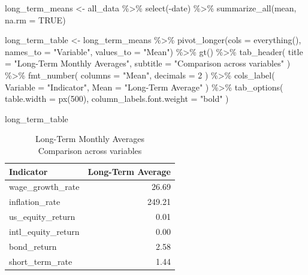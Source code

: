 \documentclass[
  letterpaper,
  DIV=11,
  numbers=noendperiod]{scrartcl}
\newenvironment{Shaded}{\begin{snugshade}}{\end{snugshade}}
\newcommand{\AttributeTok}[1]{\textcolor[rgb]{0.40,0.45,0.13}{#1}}
\newcommand{\ConstantTok}[1]{\textcolor[rgb]{0.56,0.35,0.01}{#1}}
\newcommand{\DecValTok}[1]{\textcolor[rgb]{0.68,0.00,0.00}{#1}}
\newcommand{\FunctionTok}[1]{\textcolor[rgb]{0.28,0.35,0.67}{#1}}
\newcommand{\NormalTok}[1]{\textcolor[rgb]{0.00,0.23,0.31}{#1}}
\newcommand{\OtherTok}[1]{\textcolor[rgb]{0.00,0.23,0.31}{#1}}
\newcommand{\SpecialCharTok}[1]{\textcolor[rgb]{0.37,0.37,0.37}{#1}}
\newcommand{\StringTok}[1]{\textcolor[rgb]{0.13,0.47,0.30}{#1}}
\begin{document}
\begin{Shaded}
\begin{Highlighting}[]
\NormalTok{long\_term\_means }\OtherTok{\textless{}{-}}\NormalTok{ all\_data }\SpecialCharTok{\%\textgreater{}\%}
  \FunctionTok{select}\NormalTok{(}\SpecialCharTok{{-}}\NormalTok{date) }\SpecialCharTok{\%\textgreater{}\%}
  \FunctionTok{summarize\_all}\NormalTok{(mean, }\AttributeTok{na.rm =} \ConstantTok{TRUE}\NormalTok{)}

\NormalTok{long\_term\_table }\OtherTok{\textless{}{-}}\NormalTok{ long\_term\_means }\SpecialCharTok{\%\textgreater{}\%}
  \FunctionTok{pivot\_longer}\NormalTok{(}\AttributeTok{cols =} \FunctionTok{everything}\NormalTok{(), }\AttributeTok{names\_to =} \StringTok{"Variable"}\NormalTok{, }\AttributeTok{values\_to =} \StringTok{"Mean"}\NormalTok{) }\SpecialCharTok{\%\textgreater{}\%}
  \FunctionTok{gt}\NormalTok{() }\SpecialCharTok{\%\textgreater{}\%}
  \FunctionTok{tab\_header}\NormalTok{(}
    \AttributeTok{title =} \StringTok{"Long{-}Term Monthly Averages"}\NormalTok{,}
    \AttributeTok{subtitle =} \StringTok{"Comparison across variables"}
\NormalTok{  ) }\SpecialCharTok{\%\textgreater{}\%}
  \FunctionTok{fmt\_number}\NormalTok{(}
    \AttributeTok{columns =} \StringTok{"Mean"}\NormalTok{,}
    \AttributeTok{decimals =} \DecValTok{2}
\NormalTok{  ) }\SpecialCharTok{\%\textgreater{}\%}
  \FunctionTok{cols\_label}\NormalTok{(}
    \AttributeTok{Variable =} \StringTok{"Indicator"}\NormalTok{,}
    \AttributeTok{Mean =} \StringTok{"Long{-}Term Average"}
\NormalTok{  ) }\SpecialCharTok{\%\textgreater{}\%}
  \FunctionTok{tab\_options}\NormalTok{(}
    \AttributeTok{table.width =} \FunctionTok{px}\NormalTok{(}\DecValTok{500}\NormalTok{),}
    \AttributeTok{column\_labels.font.weight =} \StringTok{"bold"}
\NormalTok{  )}

\NormalTok{long\_term\_table}
\end{Highlighting}
\end{Shaded}

\begin{table}
\caption*{
{\large Long-Term Monthly Averages} \\ 
{\small Comparison across variables}
} 
\fontsize{12.0pt}{14.4pt}\selectfont
\begin{tabular*}{375pt}{@{\extracolsep{\fill}}lr}
\toprule
Indicator & Long-Term Average \\ 
\midrule\addlinespace[2.5pt]
wage\_growth\_rate & 26.69 \\ 
inflation\_rate & 249.21 \\ 
us\_equity\_return & 0.01 \\ 
intl\_equity\_return & 0.00 \\ 
bond\_return & 2.58 \\ 
short\_term\_rate & 1.44 \\ 
\bottomrule
\end{tabular*}
\end{table}
\end{document}
